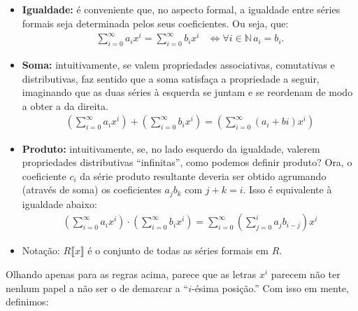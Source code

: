 \begin{itemize}
    \item \textbf{Igualdade:} é conveniente que, no aspecto formal, a igualdade entre séries formais seja determinada pelos seus coeficientes. Ou seja, que:
    \begin{align*}
      \sum_{i=0}^\infty a_ix^i=\sum_{i=0}^\infty b_ix^i & \Leftrightarrow \forall i\in \mathbb N\, a_i=b_i.
    \end{align*}
    \item \textbf{Soma:} intuitivamente, se valem propriedades associativas, comutativas e distributivas, faz sentido que a soma satisfaça a propriedade a seguir, imaginando que as duas séries à esquerda se juntam e se reordenam de modo a obter a da direita.
    \begin{align*}
        \left(\sum_{i=0}^\infty a_ix^i\right)+\left(\sum_{i=0}^\infty b_ix^i\right)=\left(\sum_{i=0}^\infty (a_i+bi)x^i\right)
    \end{align*}
    \item \textbf{Produto:} intuitivamente, se, no lado esquerdo da igualdade, valerem propriedades distributivas ``infinitas'', como podemos definir produto? Ora, o coeficiente $c_i$ da série produto resultante deveria ser obtido agrumando (através de soma) os coeficientes $a_jb_k$ com $j+k=i$. Isso é equivalente à igualdade abaixo:
    \begin{align*}
        \left(\sum_{i=0}^\infty a_ix^i\right)\cdot\left(\sum_{i=0}^\infty b_ix^i\right)=\sum_{i=0}^\infty \left(\sum_{j=0}^i a_{j}b_{i-j}\right)x^i
    \end{align*}
    \item Notação: $R\llbracket x \rrbracket$ é o conjunto de todas as séries formais em $R$.
\end{itemize}
Olhando apenas para as regras acima, parece que as letras $x^i$ parecem não ter nenhum papel a não ser o de demarcar a ``$i$-ésima posição.'' Com isso em mente, definimos:
